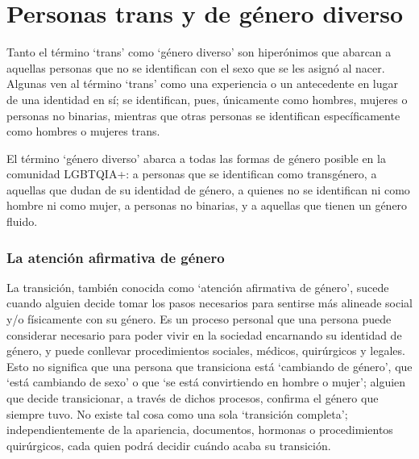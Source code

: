 \documentclass[12pt,openany]{book}
\begin{document}
\section*{Personas trans y de género diverso}

Tanto el término `trans' como `género diverso' son hiperónimos que abarcan a aquellas personas que no se identifican con el sexo que se les asignó al nacer. Algunas ven al término `trans' como una experiencia o un antecedente en lugar de una identidad en sí; se identifican, pues, únicamente como hombres, mujeres o personas no binarias, mientras que otras personas se identifican específicamente como hombres o mujeres trans.

El término `género diverso' abarca a todas las formas de género posible en la comunidad LGBTQIA+: a personas que se identifican como transgénero, a aquellas que dudan de su identidad de género, a quienes no se identifican ni como hombre ni como mujer, a personas no binarias, y a aquellas que tienen un género fluido.

\begin{figure}[h]
    \centering
\end{figure}

\subsubsection*{La atención afirmativa de género}

La transición, también conocida como `atención afirmativa de género', sucede cuando alguien decide tomar los pasos necesarios para sentirse más alineade social y/o físicamente con su género. Es un proceso personal que una persona puede considerar necesario para poder vivir en la sociedad encarnando su identidad de género, y puede conllevar procedimientos sociales, médicos, quirúrgicos y legales. Esto no significa que una persona que transiciona está `cambiando de género', que `está cambiando de sexo' o que `se está convirtiendo en hombre o mujer'; alguien que decide transicionar, a través de dichos procesos, confirma el género que siempre tuvo. No existe tal cosa como una sola  `transición completa'; independientemente de la apariencia, documentos, hormonas o procedimientos quirúrgicos, cada quien podrá decidir cuándo acaba su transición.
\end{document}
